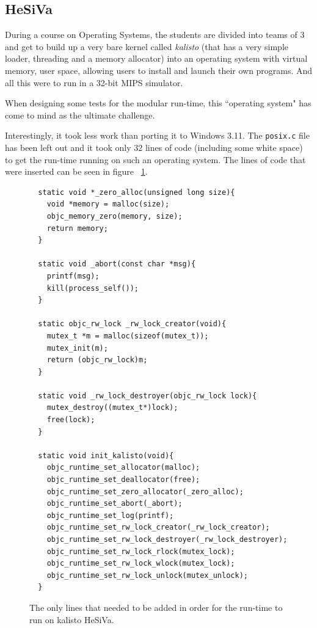 \subsection{HeSiVa}

During a course on Operating Systems, the students are divided into teams of 3 and get to build up a very bare kernel called \emph{kalisto} (that has a very simple loader, threading and a memory allocator) into an operating system with virtual memory, user space, allowing users to install and launch their own programs. And all this were to run in a 32-bit MIPS simulator.

When designing some tests for the modular run-time, this ``operating system" has come to mind as the ultimate challenge.

Interestingly, it took less work than porting it to Windows 3.11. The \verb=posix.c= file has been left out and it took only 32 lines of code (including some white space) to get the run-time running on such an operating system. The lines of code that were inserted can be seen in figure ~\ref{fig:hesiva_code}.

\begin{figure}[H]
  \begin{verbatim}
  static void *_zero_alloc(unsigned long size){
    void *memory = malloc(size);
    objc_memory_zero(memory, size);
    return memory;
  }
  
  static void _abort(const char *msg){
    printf(msg);
    kill(process_self());
  }
  
  static objc_rw_lock _rw_lock_creator(void){
    mutex_t *m = malloc(sizeof(mutex_t));
    mutex_init(m);
    return (objc_rw_lock)m;
  }
  
  static void _rw_lock_destroyer(objc_rw_lock lock){
    mutex_destroy((mutex_t*)lock);
    free(lock);
  }
  
  static void init_kalisto(void){
    objc_runtime_set_allocator(malloc);
    objc_runtime_set_deallocator(free);
    objc_runtime_set_zero_allocator(_zero_alloc);
    objc_runtime_set_abort(_abort);
    objc_runtime_set_log(printf);
    objc_runtime_set_rw_lock_creator(_rw_lock_creator);
    objc_runtime_set_rw_lock_destroyer(_rw_lock_destroyer);
    objc_runtime_set_rw_lock_rlock(mutex_lock);
    objc_runtime_set_rw_lock_wlock(mutex_lock);
    objc_runtime_set_rw_lock_unlock(mutex_unlock);
  }
  \end{verbatim}
  \centering{}
  \caption{The only lines that needed to be added in order for the run-time to run on kalisto HeSiVa.}
  \label{fig:hesiva_code}
\end{figure}

